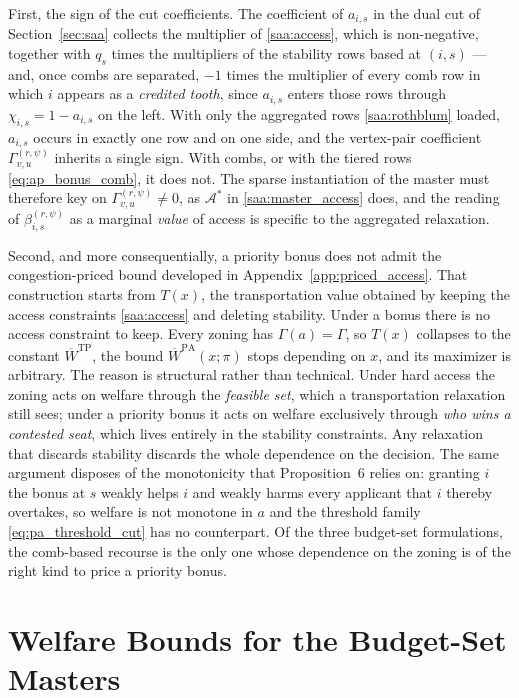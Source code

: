 \documentclass{article}
\begin{document}
First, the sign of the cut coefficients. The coefficient of $a_{i,s}$ in the dual cut of Section~\ref{sec:saa} collects the multiplier of \eqref{saa:access}, which is non-negative, together with $q_s$ times the multipliers of the stability rows based at $(i,s)$ --- and, once combs are separated, $-1$ times the multiplier of every comb row in which $i$ appears as a \emph{credited tooth}, since $a_{i,s}$ enters those rows through $\chi_{i,s} = 1 - a_{i,s}$ on the left. With only the aggregated rows \eqref{saa:rothblum} loaded, $a_{i,s}$ occurs in exactly one row and on one side, and the vertex-pair coefficient $\Gamma^{(r,\psi)}_{v,u}$ inherits a single sign. With combs, or with the tiered rows \eqref{eq:ap_bonus_comb}, it does not. The sparse instantiation of the master must therefore key on $\Gamma^{(r,\psi)}_{v,u} \neq 0$, as $\mathcal{A}^*$ in \eqref{saa:master_access} does, and the reading of $\beta^{(r,\psi)}_{i,s}$ as a marginal \emph{value} of access is specific to the aggregated relaxation.

Second, and more consequentially, a priority bonus does not admit the congestion-priced bound developed in Appendix~\ref{app:priced_access}. That construction starts from $T(x)$, the transportation value obtained by keeping the access constraints \eqref{saa:access} and deleting stability. Under a bonus there is no access constraint to keep. Every zoning has $\Gamma(a) = \Gamma$, so $T(x)$ collapses to the constant $\overline{W}^{\mathrm{TP}}$, the bound $\overline{W}^{\mathrm{PA}}(x; \pi)$ stops depending on $x$, and its maximizer is arbitrary. The reason is structural rather than technical. Under hard access the zoning acts on welfare through the \emph{feasible set}, which a transportation relaxation still sees; under a priority bonus it acts on welfare exclusively through \emph{who wins a contested seat}, which lives entirely in the stability constraints. Any relaxation that discards stability discards the whole dependence on the decision. The same argument disposes of the monotonicity that Proposition~6 relies on: granting $i$ the bonus at $s$ weakly helps $i$ and weakly harms every applicant that $i$ thereby overtakes, so welfare is not monotone in $a$ and the threshold family \eqref{eq:pa_threshold_cut} has no counterpart. Of the three budget-set formulations, the comb-based recourse is the only one whose dependence on the zoning is of the right kind to price a priority bonus.

\section{Welfare Bounds for the Budget-Set Masters}
\label{app:welfare_bounds}
\end{document}
